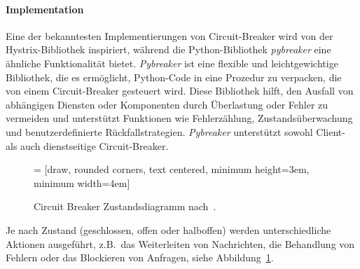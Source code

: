 \paragraph{Implementation}


Eine der bekanntesten Implementierungen von Circuit-Breaker wird von der Hystrix-Bibliothek inspiriert,
während die Python-Bibliothek \textit{pybreaker} eine ähnliche Funktionalität bietet.
\textit{Pybreaker} ist eine flexible und leichtgewichtige Bibliothek, die es ermöglicht,
Python-Code in eine Prozedur zu verpacken, die von einem Circuit-Breaker gesteuert wird.
Diese Bibliothek hilft, den Ausfall von abhängigen Diensten oder Komponenten durch Überlastung
oder Fehler zu vermeiden und unterstützt Funktionen wie Fehlerzählung,
Zustandsüberwachung und benutzerdefinierte Rückfallstrategien. %
\textit{Pybreaker} unterstützt sowohl Client- als auch dienstseitige Circuit-Breaker.

\begin{figure}
 = [draw, rounded corners,
text centered, minimum height=3em, minimum width=4em]
\centering
\centering
{}
\caption{Circuit Breaker Zustandsdiagramm nach~\cite{Montesi.19.09.2016}.}
\label{cb-fsm}
\end{figure}

Je nach Zustand (geschlossen, offen oder halboffen) werden unterschiedliche
Aktionen ausgeführt, z.B.\ das Weiterleiten von Nachrichten, die
Behandlung von Fehlern oder das Blockieren von Anfragen, siehe Abbildung~\ref{cb-fsm}.

